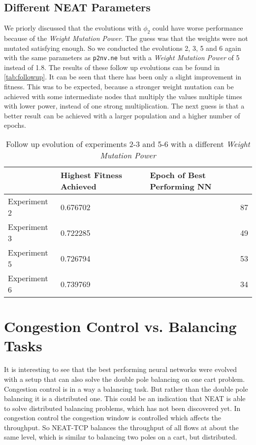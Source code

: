 \subsection{Different NEAT Parameters}\label{subsec:diffNEATpar}
We priorly discussed that the evolutions with $\phi_2$ could have worse performance because of the \textit{Weight Mutation Power}. 
The guess was that the weights were not mutated satisfying enough.
So we conducted the evolutions 2, 3, 5 and 6 again with the same parameters as \texttt{p2nv.ne} but with a \textit{Weight Mutation Power} of 5 instead of 1.8. 
The results of these follow up evolutions can be found in \autoref{tab:followup}. It can be seen that there has been only a slight improvement in fitness. This was to be expected, because a stronger weight mutation can be achieved with some intermediate nodes that multiply the values multiple times with lower power, instead of one strong multiplication. The next guess is that a better result can be achieved with a larger population and a higher number of epochs. 
\begin{table}[htbp]
  \centering
  \caption{Follow up evolution of experiments 2-3 and 5-6 with a different \textit{Weight Mutation Power}}
    \begin{tabular}{|l|l|r|}\hline
          & Highest Fitness Achieved & \multicolumn{1}{l|}{Epoch of Best Performing NN} \\ \hline
    Experiment 2 & 0.676702 & 87 \\ \hline
    Experiment 3 & 0.722285 & 49 \\ \hline
    Experiment 5 & 0.726794 & 53 \\ \hline
    Experiment 6 & 0.739769 & 34 \\ \hline
    \end{tabular}%
  \label{tab:followup}%
\end{table}%

\section{Congestion Control vs. Balancing Tasks}\label{sec:congVSbalancing}
It is interesting to see that the best performing neural networks were evolved with a setup that can also solve the double pole balancing on one cart problem. Congestion control is in a way a balancing task. But rather than the double pole balancing it is a distributed one. This could be an indication that NEAT is able to solve distributed balancing problems, which has not been discovered yet. In congestion control the congestion window is controlled which affects the throughput. So NEAT-TCP balances the throughput of all flows at about the same level, which is similar to balancing two poles on a cart, but distributed.

